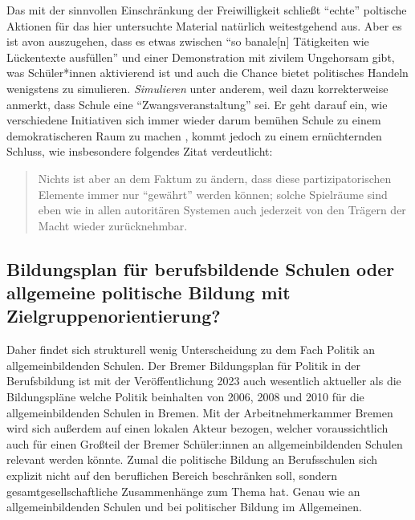 Das mit der sinnvollen Einschränkung der Freiwilligkeit schließt \enquote{echte} poltische Aktionen für das hier untersuchte Material natürlich weitestgehend aus. Aber es ist avon auszugehen, dass es etwas zwischen \enquote{so banale[n] Tätigkeiten wie Lückentexte ausfüllen} \autocite[466]{Nonnenmacher2010} und einer Demonstration mit zivilem Ungehorsam gibt, was Schüler*innen aktivierend ist und auch die Chance bietet politisches Handeln wenigstens zu simulieren. 
\emph{Simulieren} unter anderem, weil \textcite[467]{Nonnenmacher2010} dazu korrekterweise anmerkt, dass Schule eine \enquote{Zwangsveranstaltung} sei. Er geht darauf ein, wie verschiedene Initiativen sich immer wieder darum bemühen Schule zu einem demokratischeren Raum zu machen \autocite[467-469]{Nonnenmacher2010}, kommt jedoch zu einem ernüchternden Schluss, wie insbesondere folgendes Zitat verdeutlicht:
\begin{quote}
    Nichts ist aber an dem Faktum zu ändern, dass diese partizipatorischen Elemente immer nur \enquote{gewährt} werden können; solche Spielräume sind eben wie in allen autoritären Systemen auch jederzeit von den Trägern der Macht wieder zurücknehmbar. 

    \autocite[468]{Nonnenmacher2010}
\end{quote}




\subsection{Bildungsplan für berufsbildende Schulen oder allgemeine politische Bildung mit Zielgruppenorientierung?}
Daher findet sich strukturell wenig Unterscheidung zu dem Fach Politik an allgemeinbildenden Schulen.
Der Bremer Bildungsplan für Politik in der Berufsbildung ist mit der Veröffentlichung 2023 auch wesentlich aktueller als die Bildungspläne welche Politik beinhalten von 2006, 2008 und 2010 für die allgemeinbildenden Schulen in Bremen. 
Mit der Arbeitnehmerkammer Bremen wird sich außerdem auf einen lokalen Akteur bezogen, welcher voraussichtlich auch für einen Großteil der Bremer Schüler:innen an allgemeinbildenden Schulen relevant werden könnte. 
Zumal die politische Bildung an Berufsschulen sich explizit nicht auf den beruflichen Bereich beschränken soll, sondern gesamtgesellschaftliche Zusammenhänge zum Thema hat. Genau wie an allgemeinbildenden Schulen und bei politischer Bildung im Allgemeinen.

